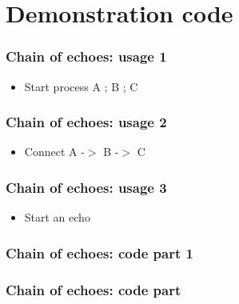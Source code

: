 \section{Demonstration code}

\frame{\tableofcontents[currentsection]}

\begin{frame}
    \frametitle{Chain of echoes: usage 1}
    \begin{center}
        \begin{itemize}
            \item Start process A ; B ; C
        \end{itemize}


    \end{center}
\end{frame}

\begin{frame}
    \frametitle{Chain of echoes: usage 2}
    \begin{center}
        \begin{itemize}
            \item Connect A -$>$ B -$>$ C
        \end{itemize}


    \end{center}
\end{frame}

\begin{frame}
    \frametitle{Chain of echoes: usage 3}
    \begin{center}
        \begin{itemize}
            \item Start an echo
        \end{itemize}


    \end{center}
\end{frame}

\begin{frame}
    \frametitle{Chain of echoes: code part 1}
    \begin{center}
    \end{center}
\end{frame}

\begin{frame}
    \frametitle{Chain of echoes: code part }
    \begin{center}
    \end{center}
\end{frame}
